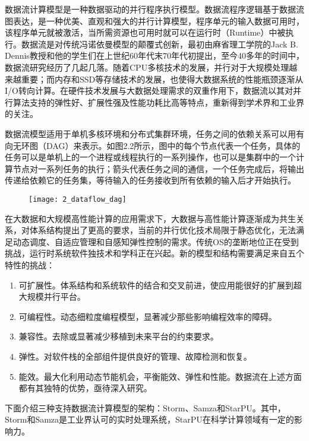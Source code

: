 数据流计算模型是一种数据驱动的并行程序执行模型。数据流程序逻辑基于数据流图表达，是一种优美、直观和强大的并行计算模型，程序单元的输入数据可用时，该程序单元就被激活，当所需资源也可用时就可以在运行时（Runtime）中被执行。数据流是对传统冯诺依曼模型的颠覆式创新，最初由麻省理工学院的Jack B. Dennis教授和他的学生们在上世纪60年代末70年代初提出\citep{dennis1974data}，至今40多年的时间中，数据流研究经历了几起几落。随着CPU多核技术的发展，并行对于大规模处理越来越重要；而内存和SSD等存储技术的发展，也使得大数据系统的性能瓶颈逐渐从I/O转向计算。在硬件技术发展与大数据处理需求的双重作用下，数据流以其对并行算法支持的弹性好、扩展性强及性能功耗比高等特点，重新得到学术界和工业界的关注。

数据流模型适用于单机多核环境和分布式集群环境，任务之间的依赖关系可以用有向无环图（DAG）来表示。如图2.2所示，图中的每个节点代表一个任务，具体的任务可以是单机上的一个进程或线程执行的一系列操作，也可以是集群中的一个计算节点对一系列任务的执行；箭头代表任务之间的通信，一个任务完成后，将输出传递给依赖它的任务集，等待输入的任务接收到所有依赖的输入后才开始执行。

\begin{figure}[!htbp]
    \centering
    \texttt{[image: 2\_dataflow\_dag]}
    \label{fig:2_dataflow_dag}
\end{figure}

在大数据和大规模高性能计算的应用需求下，大数据与高性能计算逐渐成为共生关系，对体系结构提出了更高的要求，当前的并行优化技术局限于静态优化，无法满足动态调度、自适应管理和自感知弹性控制的需求。传统OS的垄断地位正在受到挑战，运行时系统软件独技术和学科正在兴起。新的模型和结构需要满足来自五个特性的挑战：

\begin{enumerate}
	\item 可扩展性。体系结构和系统软件的结合和交叉前进，使应用能很好的扩展到超大规模并行平台。
	\item 可编程性。动态细粒度编程模型，显著减少那些影响编程效率的障碍。
	\item 兼容性。去除或显著减少移植到未来平台的约束要求。
	\item 弹性。对软件栈的全部组件提供良好的管理、故障检测和恢复。
	\item 能效。最大化利用动态节能机会，平衡能效、弹性和性能。数据流在上述方面都有其独特的优势，亟待深入研究。
\end{enumerate}

下面介绍三种支持数据流计算模型的架构：Storm、Samza和StarPU。其中，Storm和Samza是工业界认可的实时处理系统，StarPU在科学计算领域有一定的影响力。

